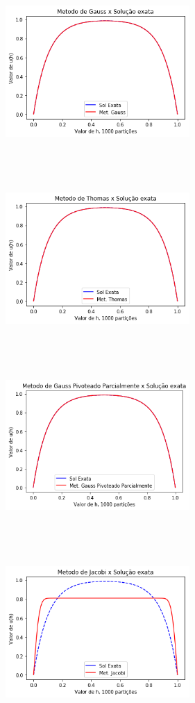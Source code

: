 \documentclass{article}
\begin{document}
\begin{itemize}
\begin{figure}[!htb]
\includegraphics[width=7cm,height=7cm]{G1000part.png}
\includegraphics [width=7cm,height=7cm]{T1000part}
\includegraphics [width=7cm,height=7cm]{GP1000part.png}
\includegraphics [width=7cm,height=7cm]{J1000part.png}
\end{figure}



\end{itemize}
\end{document}

